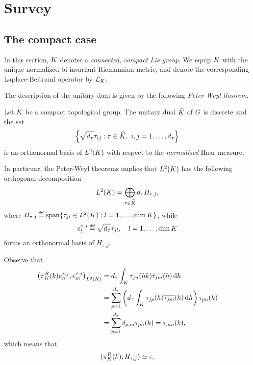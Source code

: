 \chapter{Survey}

\section{The compact case}

In this section,
$\CompactGroup$ denotes a \emph{connected, compact Lie group}.
We equip $\CompactGroup$ with the unique normalized bi-invariant Riemannian metric,
and denote the corresponding Laplace-Beltrami operator by $\Laplacian [\CompactGroup]$.

The description of the unitary dual is given by the following \emph{Peter-Weyl theorem}.

\begin{theorem}
\label{theorem:Peter-Weyl_theorem}
    Let $\CompactGroup$ be a compact topological group.
    The unitary dual $\dualGroup \CompactGroup$ of $\Group$ is discrete and
    the set
    \begin{align*}
        \left\{
            \sqrt{\dimRep\tau} \tau_{ij} : \tau \in \dualGroup\CompactGroup,\ i, j = 1, \dots, \dimRep\tau
        \right\}
    \end{align*}
    is an orthonormal basis of $\Lebesgue{2}{\CompactGroup}$ with respect to the \emph{normalised} Haar measure.
\end{theorem}

In particuar,
the Peter-Weyl theorems implies that $\Lebesgue 2 \CompactGroup$ has the following orthogonal decomposition
\begin{align}
    \Lebesgue 2 \CompactGroup
    = \bigoplus_{\tau \in \dualGroup \CompactGroup} \dimRep \tau H_{\tau, j},
    \label{eq:decomposition_of_L2_for_compact_groups}
\end{align}
where $H_{\tau, j} \defeq \Span\{\tau_{j l} \in \Lebesgue 2 \CompactGroup : l = 1, \dots, \dim \CompactGroup\}$,
while
\begin{align*}
    e^{\tau, j}_l \defeq \sqrt {\dimRep \tau} \tau_{j l}, \quad l = 1, \dots, \dim \CompactGroup
\end{align*}
forms an orthonormal basis of $H_{\tau, j}$.

Observe that
\begin{align*}
    \ip [\Lebesgue 2 \CompactGroup] {\RightRegularRepresentation(k) e^{\tau, j}_n} {e^{\tau, j}_m}
    &= \dimRep \tau \int_\CompactGroup \tau_{j n}(h k) \conj{\tau_{j m}}(h) \dd h\\
    &= \sum_{p = 1}^{\dimRep \tau} \left( \dimRep \tau \int_\CompactGroup \tau_{j p}(h) \conj{\tau_{j m}}(h) \dd h \right) \tau_{p n}(k)\\
    &= \sum_{p = 1}^{\dimRep \tau} \Kronecker p m \tau_{p n}(k) = \tau_{m n}(k),
\end{align*}
which means that
\begin{align*}
    (\RightRegularRepresentation(k), H_{\tau, j}) \simeq \tau.
\end{align*}

